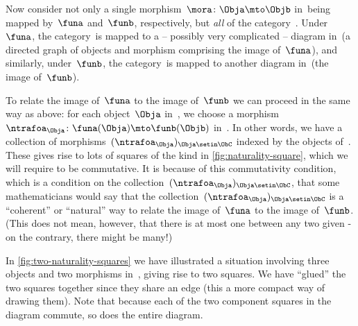 Now consider not only a single morphism~$\mora \colon \Obja \mto \Objb$ in~\CatC being mapped by~$\funa$ and~$\funb$, respectively, but \emph{all} of the category~\CatC.
Under~$\funa$, the category~\CatC is mapped to a -- possibly very complicated --  diagram in~\CatD (a directed graph of objects and morphism comprising the image of~$\funa$), and similarly, under~$\funb$, the category~\CatC is mapped to another diagram in~\CatD (the image of~$\funb$).

To relate the image of~$\funa$ to the image of~$\funb$ we can proceed in the same way as above: for each object~$\Obja$ in~\CatC, we choose a morphism~$\ntrafoa_\Obja \colon \funa(\Obja) \mto \funb(\Objb)$ in~\CatD.
In other words, we have a collection of morphisms~$(\ntrafoa_\Obja)_{\Obja \setin \ObC}$ indexed by the objects of~\CatC.
These gives rise to lots of squares of the kind in \cref{fig:naturality-square}, which we will require to be commutative.
It is because of this commutativity condition, which is a condition on the collection~$(\ntrafoa_\Obja)_{\Obja \setin \ObC}$, that some mathematicians would say that the collection~$(\ntrafoa_\Obja)_{\Obja \setin \ObC}$ is a ``coherent'' or ``natural'' way to relate the image of~$\funa$ to the image of~$\funb$.
(This does not mean, however, that there is at most one  between any two given - on the contrary, there might be many!)

In \cref{fig:two-naturality-squares} we have illustrated a situation involving three objects and two morphisms in~\CatC, giving rise to two squares.
We have ``glued'' the two squares together since they share an edge (this a more compact way of drawing them).
Note that because each of the two component squares in the diagram commute, so does the entire diagram.

%
\begin{marginfigure}
    \centering
    \caption{}
    \label{fig:two-naturality-squares}
\end{marginfigure}
%

\


